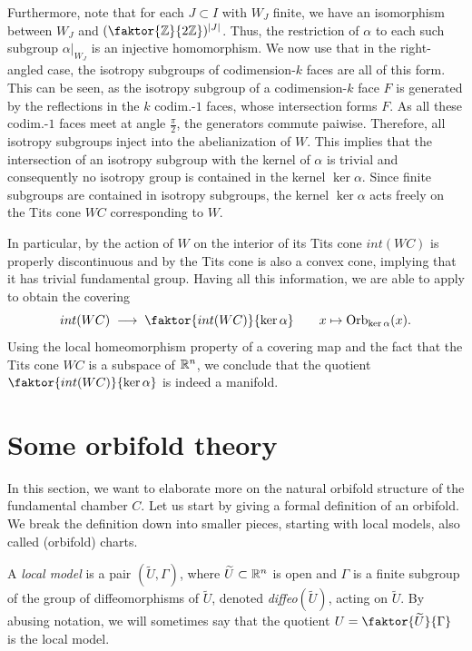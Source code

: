 Furthermore, note that for each \(J \subset I\) with \(W_J\) finite, we have an isomorphism between \(W_J\) and \((\faktor{\Z}{2\Z})^{\abs{J}}\).
Thus, the restriction of \(\alpha\) to each such subgroup \(\alpha\vert_{W_J}\) is an injective homomorphism.
We now use that in the right-angled case, the isotropy subgroups of codimension-\(k\) faces are all of this form.
This can be seen, as the isotropy subgroup of a codimension-\(k\) face \(F\) is generated by the reflections in the \(k\) codim.-\(1\) faces, whose intersection forms \(F\).
As all these codim.-\(1\) faces meet at angle \(\frac{\pi}{2}\), the generators commute paiwise.
Therefore, all isotropy subgroups inject into the abelianization of \(W\).
This implies that the intersection of an isotropy subgroup with the kernel of \(\alpha\) is trivial and consequently no isotropy group is contained in the kernel \(\ker\alpha\).
Since finite subgroups are contained in isotropy subgroups, the kernel \(\ker\alpha\) acts freely on the Tits cone \(WC\) corresponding to \(W\).

In particular, by  the action of \(W\) on the interior of its Tits cone \(int(WC)\) is properly discontinuous and by  the Tits cone is also a convex cone, implying that it has trivial fundamental group.
Having all this information, we are able to apply  to obtain the covering
\[int(WC) \;\longrightarrow\; \faktor{int(WC)}{\ker\alpha} \qquad x \mapsto \text{Orb}_{\ker\alpha}(x).\]
Using the local homeomorphism property of a covering map and the fact that the Tits cone \(WC\) is a subspace of \(\mathbb{R}^n\), we conclude that the quotient \(\faktor{int(WC)}{\ker\alpha}\) is indeed a manifold.


\section{Some orbifold theory}

In this section, we want to elaborate more on the natural orbifold structure of the fundamental chamber \(C\).
Let us start by giving a formal definition of an orbifold.
We break the definition down into smaller pieces, starting with local models, also called (orbifold) charts.

\begin{definition}
    A \emph{local model} is a pair \((\widetilde{U}, \Gamma)\), where \(\widetilde{U} \subset \mathbb{R}^n\) is open and \(\Gamma\) is a finite subgroup of the group of diffeomorphisms of \(\widetilde{U}\), denoted \emph{diffeo}\((\widetilde{U})\), acting on \(\widetilde{U}\).
    By abusing notation, we will sometimes say that the quotient \(U = \faktor{\widetilde{U}}{\Gamma}\;\) is the local model.
\end{definition}

